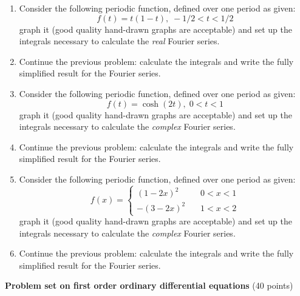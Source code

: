 \documentclass[fleqn]{article}
\begin{document}
\begin{enumerate}
  \item Consider the following periodic function, defined over one period as given: 
  $$
  f\left( t\right) =t\left( 1-t\right) ,\;-1/2<t<1/2
  $$
  graph it (good quality hand-drawn graphs are acceptable) and set up the integrals necessary to calculate the \emph{real} Fourier series. 
  
  
  \item Continue the previous problem:  calculate the integrals and write the fully simplified result for the Fourier series. 
  
  
  \item Consider the following periodic function, defined over one period as given: 
  \[
  f\left( t\right) =\cosh \left( 2t\right) ,\;0<t<1
  \]
  graph it (good quality hand-drawn graphs are acceptable) and set up the integrals necessary to calculate the \emph{complex} Fourier series. 
  
  
  \item Continue the previous problem:  calculate the integrals and write the fully simplified result for the Fourier series. 
  
  
  \item Consider the following periodic function, defined over one period as given: 
  \[
  f\left( x\right) =\left\{ 
  \begin{array}{rrr}
  \left( 1-2x\right) ^{2} & \, & 0<x<1 \\ 
  -\left( 3-2x\right) ^{2} & \, & 1<x<2
  \end{array}
  \right. 
  \]
  graph it (good quality hand-drawn graphs are acceptable) and set up the integrals necessary to calculate the \emph{complex} Fourier series. 
  
  
  \item Continue the previous problem:  calculate the integrals and write the fully simplified result for the Fourier series. 
  
  
  \end{enumerate}

\pagebreak

\textbf{Problem set on first order ordinary differential equations} (40 points)
\end{document}
